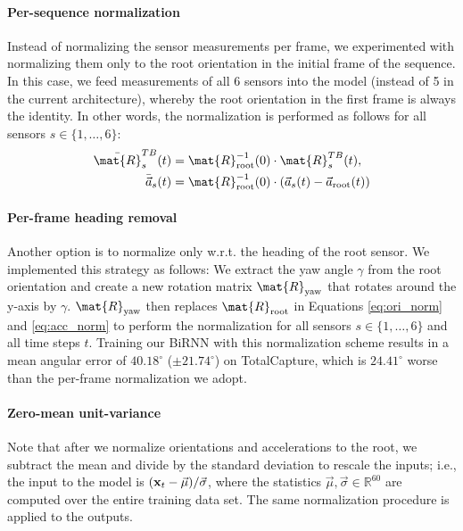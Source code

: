 \documentclass[acmtog]{acmart}
\begin{document}
\paragraph*{Per-sequence normalization}
Instead of normalizing the sensor measurements per frame, we experimented with normalizing them only to the root orientation in the initial frame of the sequence. In this case, we feed measurements of all 6 sensors into the model (instead of 5 in the current architecture), whereby the root orientation in the first frame is always the identity. In other words, the normalization is performed as follows for all sensors $s \in \{1, \dotsc, 6 \}$:
\begin{align*}
\bar{\mat{R}}^{TB}_s(t) &= \mat{R}_\text{root}^{-1}(0) \cdot \mat{R}^{TB}_s(t), \\
\bar{\vec{a}}_s(t) &= \mat{R}_\text{root}^{-1}(0)\cdot(\vec{a}_s(t) - \vec{a}_\text{root}(t)) 
\end{align*}\paragraph*{Per-frame heading removal}
Another option is to normalize only w.r.t. the heading of the root sensor. We implemented this strategy as follows: We extract the yaw angle $\gamma$ from the root orientation and create a new rotation matrix  $\mat{R}_{\text{yaw}}$ that rotates around the y-axis by $\gamma$. $\mat{R}_{\text{yaw}}$ then replaces $\mat{R}_\text{root}$ in Equations \eqref{eq:ori_norm} and \eqref{eq:acc_norm} to perform the normalization for all sensors $s \in \{1, \dotsc, 6 \}$ and all time steps $t$. Training our BiRNN with this normalization scheme results in a mean angular error of $40.18^\circ$ ($\pm 21.74^\circ$) on TotalCapture, which is $24.41^\circ$ worse than the per-frame normalization we adopt.

\paragraph*{Zero-mean unit-variance}
Note that after we normalize orientations and accelerations to the root, we subtract the mean and divide by the standard deviation to rescale the inputs; i.e., the input to the model is $(\mathbf{x}_t - \vec{\mu})/\vec{\sigma}$, where the statistics $\vec{\mu}, \vec{\sigma} \in \mathbb{R}^{60}$ are computed over the entire training data set. The same normalization procedure is applied to the outputs.
\end{document}
